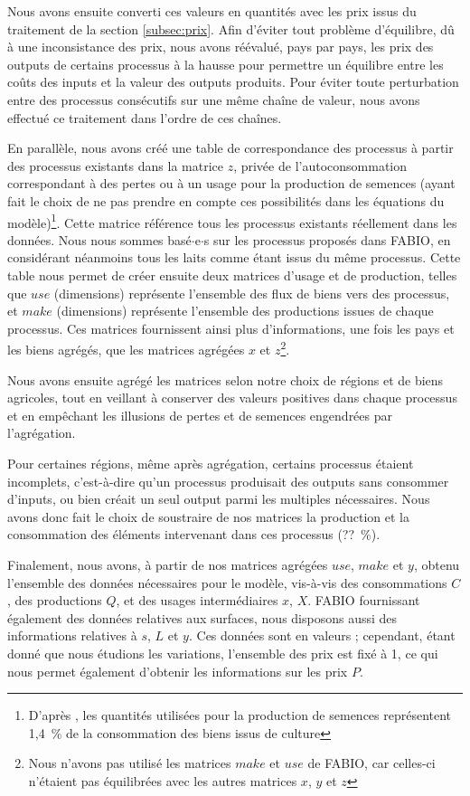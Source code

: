 Nous avons ensuite converti ces valeurs en quantités avec les prix issus du traitement de la section \ref{subsec:prix}. Afin d'éviter tout problème d'équilibre, dû à une inconsistance des prix, nous avons réévalué, pays par pays, les prix des outputs de certains processus à la hausse pour permettre un équilibre entre les coûts des inputs et la valeur des outputs produits. Pour éviter toute perturbation entre des processus consécutifs sur une même chaîne de valeur, nous avons effectué ce traitement dans l'ordre de ces chaînes.

En parallèle, nous avons créé une table de correspondance des processus à partir des processus existants dans la matrice $z$, privée de l'autoconsommation correspondant à des pertes ou à un usage pour la production de semences (ayant fait le choix de ne pas prendre en compte ces possibilités dans les équations du modèle)\footnote{D'après \cite{Bruckner2019}, les quantités utilisées pour la production de semences représentent 1,4~\% de la consommation des biens issus de culture}. Cette matrice référence tous les processus existants réellement dans les données. Nous nous sommes basé$\cdot$e$\cdot$s sur les processus proposés dans FABIO, en considérant néanmoins tous les laits comme étant issus du même processus. Cette table nous permet de créer ensuite deux matrices d'usage et de production, telles que $use$ (dimensions) représente l'ensemble des flux de biens vers des processus, et $make$ (dimensions) représente l'ensemble des productions issues de chaque processus. Ces matrices fournissent ainsi plus d'informations, une fois les pays et les biens agrégés, que les matrices agrégées $x$ et $z$\footnote{Nous n'avons pas utilisé les matrices $make$ et $use$ de FABIO, car celles-ci n'étaient pas équilibrées avec les autres matrices $x$, $y$ et $z$}.

Nous avons ensuite agrégé les matrices selon notre choix de régions et de biens agricoles, tout en veillant à conserver des valeurs positives dans chaque processus et en empêchant les illusions de pertes et de semences engendrées par l'agrégation.

Pour certaines régions, même après agrégation, certains processus étaient incomplets, c'est-à-dire qu'un processus produisait des outputs sans consommer d'inputs, ou bien créait un seul output parmi les multiples nécessaires. Nous avons donc fait le choix de soustraire de nos matrices la production et la consommation des éléments intervenant dans ces processus (??~\%).

Finalement, nous avons, à partir de nos matrices agrégées $use$, $make$ et $y$, obtenu l'ensemble des données nécessaires pour le modèle, vis-à-vis des consommations $C$, des productions $Q$, et des usages intermédiaires $x$, $X$. FABIO fournissant également des données relatives aux surfaces, nous disposons aussi des informations relatives à $s$, $L$ et $y$. Ces données sont en valeurs ; cependant, étant donné que nous étudions les variations, l'ensemble des prix est fixé à 1, ce qui nous permet également d'obtenir les informations sur les prix $P$.

